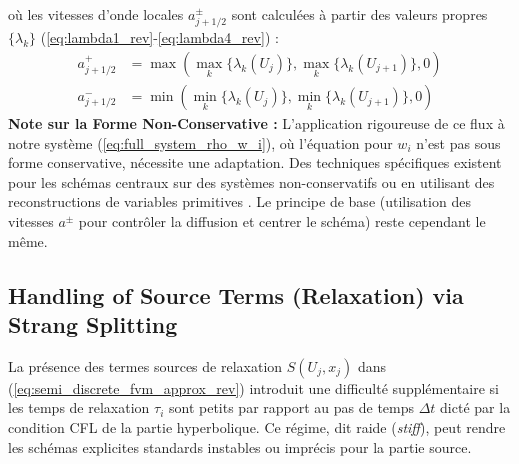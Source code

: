 où les vitesses d'onde locales \( a_{j+1/2}^{\pm} \) sont calculées à partir des valeurs propres \( \{\lambda_k\} \) (\ref{eq:lambda1_rev}-\ref{eq:lambda4_rev}) :
\begin{align}
    a_{j+1/2}^+ &= \max( \max_k\{\lambda_k(U_j)\}, \max_k\{\lambda_k(U_{j+1})\}, 0 ) \\
    a_{j+1/2}^- &= \min( \min_k\{\lambda_k(U_j)\}, \min_k\{\lambda_k(U_{j+1})\}, 0 )
\end{align}
\textbf{Note sur la Forme Non-Conservative :} L'application rigoureuse de ce flux à notre système (\ref{eq:full_system_rho_w_i}), où l'équation pour \(w_i\) n'est pas sous forme conservative, nécessite une adaptation. Des techniques spécifiques existent pour les schémas centraux sur des systèmes non-conservatifs ou en utilisant des reconstructions de variables primitives \cite{KurganovPetrova2007}. Le principe de base (utilisation des vitesses \(a^\pm\) pour contrôler la diffusion et centrer le schéma) reste cependant le même.

\subsection{Handling of Source Terms (Relaxation) via Strang Splitting}
\label{subsec:source_terms}

La présence des termes sources de relaxation \( S(U_j, x_j) \) dans (\ref{eq:semi_discrete_fvm_approx_rev}) introduit une difficulté supplémentaire si les temps de relaxation \( \tau_i \) sont petits par rapport au pas de temps \( \Delta t \) dicté par la condition CFL de la partie hyperbolique. Ce régime, dit raide (\textit{stiff}), peut rendre les schémas explicites standards instables ou imprécis pour la partie source.


